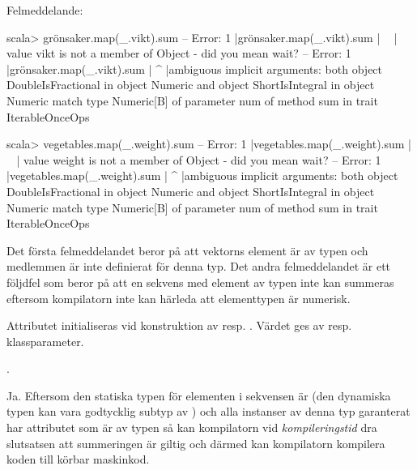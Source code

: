 \SubtaskSolved  Felmeddelande:
\ifswedish
\begin{REPLnonum}
scala> grönsaker.map(_.vikt).sum  
-- Error:                                                                                 
1 |grönsaker.map(_.vikt).sum
  |              ^^^^^^
  |             value vikt is not a member of Object - did you mean wait?
-- Error:
1 |grönsaker.map(_.vikt).sum
  |                         ^
  |ambiguous implicit arguments: both object DoubleIsFractional in object Numeric and object ShortIsIntegral in object Numeric match type Numeric[B] of parameter num of method sum in trait IterableOnceOps
\end{REPLnonum}
\else
\begin{REPLnonum}
scala> vegetables.map(_.weight).sum  
-- Error:                                                                                 
1 |vegetables.map(_.weight).sum
  |              ^^^^^^
  |             value weight is not a member of Object - did you mean wait?
-- Error:
1 |vegetables.map(_.weight).sum
  |                         ^
  |ambiguous implicit arguments: both object DoubleIsFractional in object Numeric and object ShortIsIntegral in object Numeric match type Numeric[B] of parameter num of method sum in trait IterableOnceOps
\end{REPLnonum}
\fi
Det första felmeddelandet beror på att vektorns element är av typen  och medlemmen \ifswedish{}\else{}\fi{} är inte definierat för denna typ. Det andra felmeddelandet är ett följdfel som beror på att en sekvens med element av typen  inte kan summeras eftersom kompilatorn inte kan härleda att elementtypen är numerisk.

\SubtaskSolved  Attributet \ifswedish{}\else{}\fi{} initialiseras vid konstruktion av \ifswedish{}\else{}\fi{} resp. \ifswedish{}\else{}\fi. Värdet ges av resp. klassparameter.

\SubtaskSolved  \ifswedish{}\else{}\fi.

\SubtaskSolved  Ja. Eftersom den statiska typen för elementen i sekvensen är \ifswedish{}\else{}\fi (den dynamiska typen kan vara godtycklig subtyp av \ifswedish{}\else{}\fi) och alla instanser av denna typ garanterat har attributet \ifswedish{}\else{}\fi{} som är av typen  så kan kompilatorn vid \emph{kompileringstid} dra slutsatsen att summeringen är giltig och därmed kan kompilatorn kompilera koden till körbar maskinkod.

